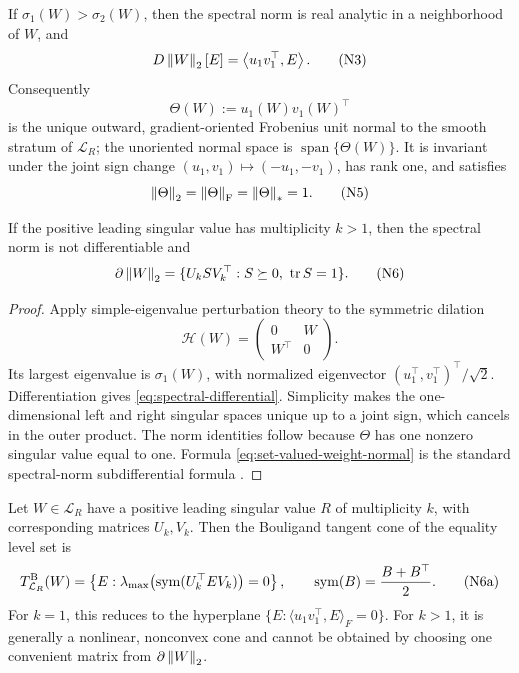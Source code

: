\begin{lemma}
\label{lem:spectral-normal}
If \(\sigma_1(W)>\sigma_2(W)\), then the spectral norm is real analytic in a
neighborhood of \(W\), and
\[
 D\left\lVert W\right\rVert_{2}[E]
 =
 \left\langle u_1v_1^\top,E\right\rangle.
\tag{N3}
\label{eq:spectral-differential}
\]
Consequently
\[
 \Theta(W):=u_1(W)v_1(W)^\top
\tag{N4}
\label{eq:true-normal}
\]
is the unique outward, gradient-oriented Frobenius unit normal to the smooth
stratum of \(\mathcal L_R\); the unoriented normal space is
\(\operatorname{span}\{\Theta(W)\}\).  It is invariant under the joint sign change
\((u_1,v_1)\mapsto(-u_1,-v_1)\), has rank one, and satisfies
\[
 \left\lVert \Theta\right\rVert_{2}=\left\lVert \Theta\right\rVert_{\mathrm F}=\left\lVert \Theta\right\rVert_{*}=1.
\tag{N5}
\]

If the positive leading singular value has multiplicity \(k>1\), then the
spectral norm is not differentiable and
\[
 \partial\left\lVert W\right\rVert_{2}
 =
 \{U_kSV_k^\top:S\succeq0,\ \operatorname{tr} S=1\}.
\tag{N6}
\label{eq:set-valued-weight-normal}
\]
\end{lemma}

\begin{proof}
Apply simple-eigenvalue perturbation theory to the symmetric dilation
\[
 \mathcal H(W)
 =
 \begin{pmatrix}0&W\\W^\top&0\end{pmatrix}.
\]
Its largest eigenvalue is \(\sigma_1(W)\), with normalized eigenvector
\((u_1^\top,v_1^\top)^\top/\sqrt2\).  Differentiation gives
\eqref{eq:spectral-differential}.  Simplicity makes the one-dimensional left
and right singular spaces unique up to a joint sign, which cancels in the
outer product.  The norm identities follow because \(\Theta\) has one
nonzero singular value equal to one.  Formula
\eqref{eq:set-valued-weight-normal} is the standard spectral-norm
subdifferential formula \citep{watson1992subdifferential}.
\end{proof}

\begin{proposition}
\label{prop:repeated-top-tangent-cone}
Let \(W\in\mathcal L_R\) have a positive leading singular value \(R\) of
multiplicity \(k\), with corresponding matrices \(U_k,V_k\).  Then the
Bouligand tangent cone of the equality level set is
\[
 T_{\mathcal L_R}^{\rm B}(W)
 =
 \left\{
 E:
 \lambda_{\max}\!\left(
 \operatorname{sym}(U_k^\top E V_k)
 \right)=0
 \right\},
\qquad
\operatorname{sym}(B)=\frac{B+B^\top}{2}.
\tag{N6a}
\label{eq:repeated-top-tangent-cone}
\]
For \(k=1\), this reduces to the hyperplane
\(\{E:\langle u_1v_1^\top,E\rangle_F=0\}\).  For \(k>1\), it is generally a
nonlinear, nonconvex cone and cannot be obtained by choosing one convenient
matrix from \(\partial\left\lVert W\right\rVert_{2}\).
\end{proposition}

